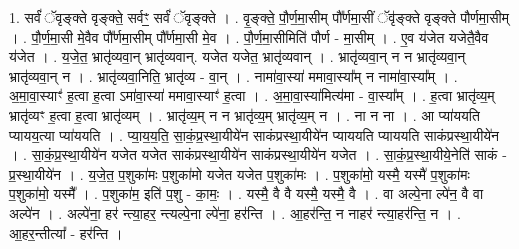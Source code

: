 \documentclass[17pt]{extarticle}
\begin{document}
1. सर्वं॑ ॅवृङ्क्ते वृङ्क्ते॒ सर्वꣳ॒॒ सर्वं॑ ॅवृङ्क्ते । . वृ॒ङ्क्ते॒ पौ॒र्ण॒मा॒सीम् पौ᳚र्णमा॒सीं ॅवृ॑ङ्क्ते वृङ्क्ते पौर्णमा॒सीम् । . पौ॒र्ण॒मा॒सी मे॒वैव पौ᳚र्णमा॒सीम् पौ᳚र्णमा॒सी मे॒व । . पौ॒र्ण॒मा॒सीमिति॑ पौर्ण - मा॒सीम् । . ए॒व य॑जेत यजेतै॒वैव य॑जेत । . य॒जे॒त॒ भ्रातृ॑व्यवा॒न् भ्रातृ॑व्यवान्. यजेत यजेत॒ भ्रातृ॑व्यवान् । . भ्रातृ॑व्यवा॒न् न न भ्रातृ॑व्यवा॒न् भ्रातृ॑व्यवा॒न् न । . भ्रातृ॑व्यवा॒निति॒ भ्रातृ॑व्य - वा॒न् । . नामा॑वा॒स्या॑ ममावा॒स्या᳚म् न नामा॑वा॒स्या᳚म् । . अ॒मा॒वा॒स्याꣳ॑ ह॒त्वा ह॒त्वा ऽमा॑वा॒स्या॑ ममावा॒स्याꣳ॑ ह॒त्वा । . अ॒मा॒वा॒स्या॑मित्य॑मा - वा॒स्या᳚म् । . ह॒त्वा भ्रातृ॑व्य॒म् भ्रातृ॑व्यꣳ ह॒त्वा ह॒त्वा भ्रातृ॑व्यम् । . भ्रातृ॑व्य॒म् न न भ्रातृ॑व्य॒म् भ्रातृ॑व्य॒म् न । . ना न ना । . आ प्या॑ययति प्यायय॒त्या प्या॑ययति । . प्या॒य॒य॒ति॒ सा॒कं॒प्र॒स्था॒यीये॑न साकंप्रस्था॒यीये॑न प्याययति प्याययति साकंप्रस्था॒यीये॑न । . सा॒कं॒प्र॒स्था॒यीये॑न यजेत यजेत साकंप्रस्था॒यीये॑न साकंप्रस्था॒यीये॑न यजेत । . सा॒कं॒प्र॒स्था॒यीये॒नेति॑ साकं - प्र॒स्था॒यीये॑न । . य॒जे॒त॒ प॒शुका॑मः प॒शुका॑मो यजेत यजेत प॒शुका॑मः । . प॒शुका॑मो॒ यस्मै॒ यस्मै॑ प॒शुका॑मः प॒शुका॑मो॒ यस्मै᳚ । . प॒शुका॑म॒ इति॑ प॒शु - का॒मः॒ । . यस्मै॒ वै वै यस्मै॒ यस्मै॒ वै । . वा अल्पे॒ना ल्पे॑न॒ वै वा अल्पे॑न । . अल्पे॑ना॒ हर॑ न्त्या॒हर॒ न्त्यल्पे॒ना ल्पे॑ना॒ हर॑न्ति । . आ॒हर॑न्ति॒ न नाहर॑ न्त्या॒हर॑न्ति॒ न । . आ॒हर॒न्तीत्या᳚ - हर॑न्ति । \newline
\end{document}

